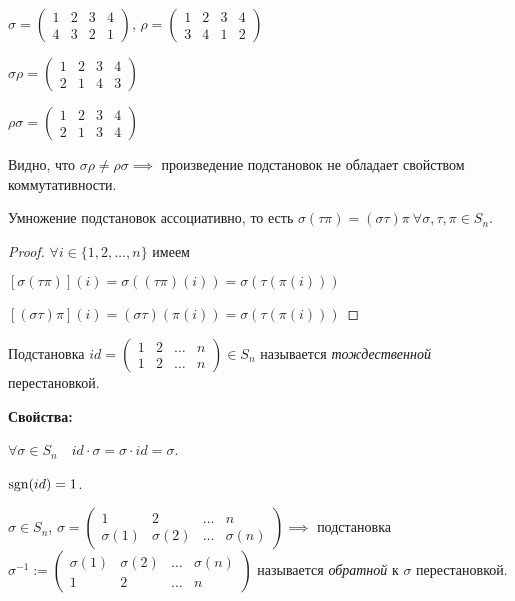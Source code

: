 $\sigma = \begin{pmatrix}
    1 & 2 & 3 & 4 \\
    4 & 3 & 2 & 1
\end{pmatrix}$, $\rho = \begin{pmatrix}
    1 & 2 & 3 & 4 \\
    3 & 4 & 1 & 2
\end{pmatrix}$

$\sigma \rho = \begin{pmatrix}
    1 & 2 & 3 & 4 \\
    2 & 1 & 4 & 3
\end{pmatrix}$

$\rho \sigma = \begin{pmatrix}
    1 & 2 & 3 & 4 \\
    2 & 1 & 3 & 4
\end{pmatrix}$

Видно, что $\sigma \rho \neq \rho \sigma \implies$ произведение подстановок не обладает свойством коммутативности.

\begin{proposition}
    Умножение подстановок ассоциативно, то есть $\sigma (\tau \pi) = (\sigma \tau) \pi \ \forall \sigma, \tau, \pi \in S_n$.
\end{proposition}

\begin{proof}
    $\forall i \in \{1, 2, \dots, n\}$ имеем

    $[\sigma(\tau \pi)](i) = \sigma((\tau \pi)(i)) = \sigma(\tau(\pi(i)))$

    $[(\sigma \tau) \pi](i) = (\sigma \tau)(\pi(i)) = \sigma(\tau(\pi(i)))$
\end{proof}


\begin{definition}
    Подстановка $id = \begin{pmatrix}
        1 & 2 & \dots & n \\
        1 & 2 & \dots & n
    \end{pmatrix} \in S_n$ называется \textit{тождественной} перестановкой.
\end{definition}

\textbf{Свойства:}

$\forall \sigma \in S_n \quad id \cdot \sigma = \sigma \cdot id = \sigma$.

$\operatorname{\mathop{\mathrm{sgn}}}(id) = 1$.

\begin{definition}
    $\sigma \in S_n$, $\sigma = \begin{pmatrix}
        1 & 2 & \dots & n \\
        \sigma(1) & \sigma(2) & \dots & \sigma(n)
    \end{pmatrix} \implies$ подстановка $\sigma^{-1} := \begin{pmatrix}
        \sigma(1) & \sigma(2) & \dots & \sigma(n) \\
        1 & 2 & \dots & n
    \end{pmatrix}$ называется \textit{обратной} к $\sigma$ перестановкой.
\end{definition}


